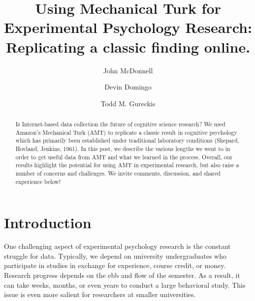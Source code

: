 \documentclass[3p,twocolumn,authoryear,10pt]{elsarticle}
\begin{document}
\begin{frontmatter}


\title{Using Mechanical Turk for Experimental Psychology Research: Replicating a classic finding online.}


\author[nyu]{John McDonnell}

\author[nyu]{Devin Domingo}

\author[nyu]{Todd M. Gureckis}


\address[nyu]{New York University}


\begin{abstract}
Is Internet-based data collection the future of cognitive science research? We used Amazon's Mechanical Turk (AMT) to replicate a classic result in cognitive psychology which has primarily been established under traditional laboratory conditions (Shepard, Hovland, Jenkins, 1961).  In this post, we describe the various lengths we went to in order to get useful data from AMT and what we learned in the process.  Overall, our results highlight the potential for using AMT in experimental research, but also raise a number of concerns and challenges. We invite comments, discussion, and shared experience below!
\end{abstract}

\end{frontmatter}

\section{Introduction}


One challenging aspect of experimental psychology research is the constant struggle for data. Typically, we depend on university undergraduates who participate in studies in exchange for experience, course credit, or money. Research progress depends on the ebb and flow of the semester. As a result, it can take weeks, months, or even years to conduct a large behavioral study. This issue is even more salient for researchers at smaller universities.
\end{document}
